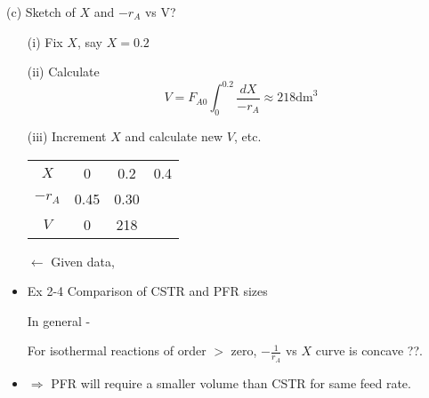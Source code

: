 %
%
%
\begin{frame}
	(c) Sketch of $X$ and $-r_A$ vs V?
	\begin{itemize}
		\item[(i)] Fix $X$, say $X = 0.2$
		\item[(ii)] Calculate $$V = F_{A0}\int_0^{0.2}\frac{dX}{-r_A}\approx218\text{dm}^3$$
		\item[(iii)] Increment $X$ and calculate new $V$, etc.
		\begin{table}
			\centering
			\begin{tabular}
				{|c|c|c|c} \hline $X$ & 0 & 0.2 & 0.4\\
				$-r_A$ & 0.45 & 0.30 &\\
				$V$ & 0 & 218 &\\
				\hline
			\end{tabular}
			$\leftarrow$ Given data,
		\end{table}
	\end{itemize}
\end{frame}

\begin{frame}
	\begin{itemize}
		\item	{\color{blue}Ex 2-4} Comparison of CSTR and PFR sizes

		In general -

		For isothermal reactions of order $>$ zero, $-\frac{1}{r_A}$ vs $X$ curve is concave ??.

		\item	$\Rightarrow$ PFR will require a smaller volume than CSTR for same feed rate.
	\end{itemize}
\end{frame}

